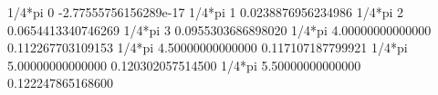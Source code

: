 \documentclass[11pt]{article}
\begin{document}



1/4*pi 0 -2.77555756156289e-17
1/4*pi 1 0.0238876956234986
1/4*pi 2 0.0654413340746269
1/4*pi 3 0.0955303686898020
1/4*pi 4.00000000000000 0.112267703109153
1/4*pi 4.50000000000000 0.117107187799921
1/4*pi 5.00000000000000 0.120302057514500
1/4*pi 5.50000000000000 0.122247865168600
\end{document}
